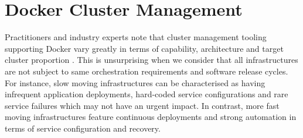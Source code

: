 \documentclass{article}
\begin{document}
\section{Docker Cluster Management}
Practitioners and industry experts note that cluster management tooling supporting Docker
vary greatly in terms of capability, architecture and target cluster proportion
\citep{goasguen, holla}. This is unsurprising when we consider that all infrastructures 
are not subject to same orchestration requirements and software release cycles.
For instance, slow moving infrastructures can be characterised as having infrequent application deployments,
 hard-coded service configurations and rare service failures which may not have an urgent impact. In contrast, more fast moving infrastructures feature continuous deployments and strong automation in terms of service configuration and recovery. 
\end{document}
